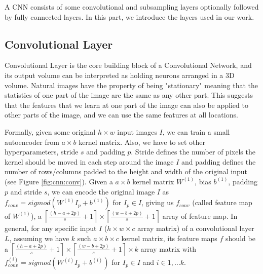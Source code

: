 A CNN consists of some convolutional and subsampling layers optionally followed by fully connected layers. In this part, we introduce the layers used in our work.
\subsection{Convolutional Layer}
Convolutional Layer is the core building block of a Convolutional Network, and its output volume can be interpreted as holding neurons arranged in a 3D volume.
Natural images have the property of being "stationary" meaning that the statistics of one part of the image are the same as any other part. This suggests that the features that we learn at one part of the image can also be applied to other parts of the image, and we can use the same features at all locations.

Formally, given some original $h\times w$ input images $I$, we can train a small autoencoder from $a \times b$ kernel matrix. Also, we have to set other hyperparameters, stride $s$ and padding $p$. Stride defines the number of pixels the kernel should be moved in each step around the image $I$ and padding defines the number of rows/columns padded to the height and width of the original input (see Figure \ref{fig:cnn:conv}). 
Given a $a \times b$ kernel matrix $W^{(1)}$, bias $b^{(1)}$, padding $p$ and stride $s$, we can encode the original image $I$ as $f_{conv}=sigmod(W^{(1)}I_p+b^{(1)})$ for $I_p \in I$, giving us $f_{conv}$ (called feature map of $W^{(1)}$), a  $\left\lceil\frac{(h-a+2p)}{s}+1\right\rceil\times\left\lceil\frac{(w-b+2p)}{s}+1\right\rceil$ array of feature map. In general, for any specific input $I$ ($h \times w \times c$ array matrix) of a convolutional layer $L$, assuming we have $k$ such $a \times b \times c$ kernel matrix, its feature maps $f$ should be a $\left\lceil\frac{(h-a+2p)}{s}+1\right\rceil\times\left\lceil\frac{(w-b+2p)}{s}+1\right\rceil \times k$ array matrix with $f_{conv}^{(i)}=sigmod(W^{(i)}I_p+b^{(i)})$ for $I_p \in I$ and $i \in 1,\dots k$.

